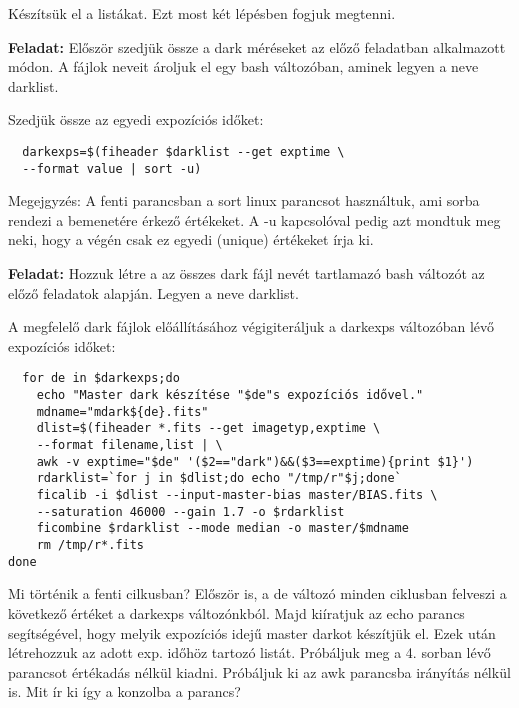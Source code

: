 \documentclass{article}
\begin{document}
Készítsük el a listákat. Ezt most két lépésben fogjuk megtenni.

{\bf Feladat:}
Először szedjük össze a dark méréseket az előző feladatban alkalmazott módon.
A fájlok neveit ároljuk el egy bash változóban, aminek legyen a neve darklist.

Szedjük össze az egyedi expozíciós időket:
\begin{verbatim}
  darkexps=$(fiheader $darklist --get exptime \
  --format value | sort -u)
\end{verbatim}

Megejgyzés: A fenti parancsban a sort linux parancsot használtuk, ami sorba
rendezi a bemenetére érkező értékeket. A -u kapcsolóval pedig azt mondtuk meg
neki, hogy a végén csak ez egyedi (unique) értékeket írja ki.

{\bf Feladat:}
Hozzuk létre a az összes dark fájl nevét tartlamazó bash változót az előző
feladatok alapján. Legyen a neve darklist.

A megfelelő dark fájlok előállításához végigiteráljuk a darkexps változóban lévő
expozíciós időket:

\begin{verbatim}
  for de in $darkexps;do
    echo "Master dark készítése "$de"s expozíciós idővel."
    mdname="mdark${de}.fits"
    dlist=$(fiheader *.fits --get imagetyp,exptime \
    --format filename,list | \
    awk -v exptime="$de" '($2=="dark")&&($3==exptime){print $1}')
    rdarklist=`for j in $dlist;do echo "/tmp/r"$j;done`
    ficalib -i $dlist --input-master-bias master/BIAS.fits \
    --saturation 46000 --gain 1.7 -o $rdarklist
    ficombine $rdarklist --mode median -o master/$mdname
    rm /tmp/r*.fits
done
\end{verbatim}

Mi történik a fenti cilkusban? Először is, a de változó minden ciklusban
felveszi a következő értéket a darkexps változónkból. Majd kiíratjuk az echo
parancs segítségével, hogy melyik expozíciós idejű master darkot készítjük el.
Ezek után létrehozzuk az adott exp. időhöz tartozó listát. Próbáljuk meg a 4.
sorban lévő parancsot értékadás nélkül kiadni. Próbáljuk ki az awk parancsba
irányítás nélkül is. Mit ír ki így a konzolba a parancs?
\end{document}
